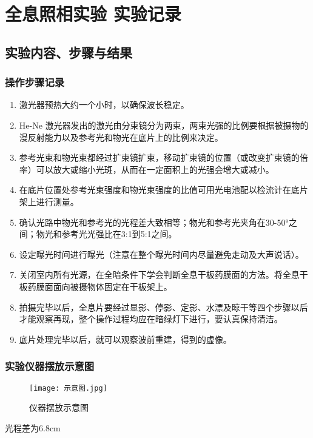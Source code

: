\documentclass[dvipsnames, svgnames,a4paper,11pt]{article}
\begin{document}
	\section{全息照相实验  \quad\heiti 实验记录}
	
	\subsection{实验内容、步骤与结果}
	
	\subsubsection{操作步骤记录}
	\begin{enumerate}
		\item 激光器预热大约一个小时，以确保波长稳定。
		\item He-Ne 激光器发出的激光由分束镜分为两束，两束光强的比例要根据被摄物的漫反射能力以及参考光和物光在底片上的比例来决定。
		\item 参考光束和物光束都经过扩束镜扩束，移动扩束镜的位置（或改变扩束镜的倍率）可以放大或缩小光斑，从而在一定面积上的光强会增大或减小。
		\item 在底片位置处参考光束强度和物光束强度的比值可用光电池配以检流计在底片架上进行测量。
		\item 确认光路中物光和参考光的光程差大致相等；物光和参考光夹角在30-50°之间；物光和参考光光强比在3:1到5:1之间。
		\item 设定曝光时间进行曝光（注意在整个曝光时间内尽量避免走动及大声说话）。
		\item 关闭室内所有光源，在全暗条件下学会判断全息干板药膜面的方法。将全息干板药膜面面向被摄物体固定在干板架上。
		\item 拍摄完毕以后，全息片要经过显影、停影、定影、水漂及晾干等四个步骤以后才能观察再现，整个操作过程均应在暗绿灯下进行，要认真保持清洁。
		\item 底片处理完毕以后，就可以观察波前重建，得到的虚像。
	\end{enumerate}
	
	\subsubsection{实验仪器摆放示意图}
	\begin{figure}[{H}]
		\centering
		\texttt{[image: 示意图.jpg]}
		\caption{仪器摆放示意图}
		\label{}
	\end{figure}
	光程差为6.8cm
\end{document}
